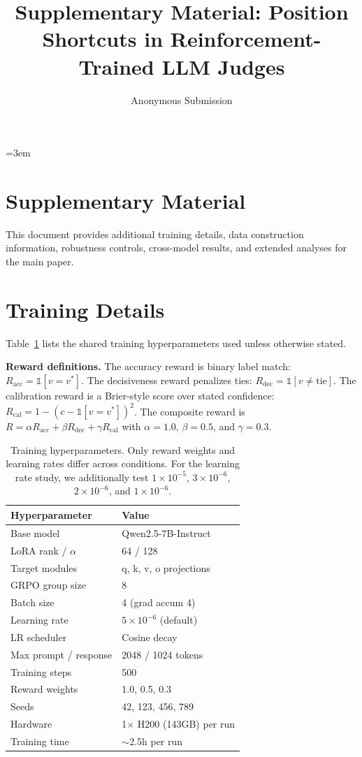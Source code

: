 \documentclass[letterpaper]{article}
\title{Supplementary Material: Position Shortcuts in Reinforcement-Trained LLM Judges}
\author{Anonymous Submission}
\begin{document}
\emergencystretch=3em
\maketitle

\section*{Supplementary Material}
This document provides additional training details, data construction information, robustness controls, cross-model results, and extended analyses for the main paper.

\appendix
\section{Training Details}
\label{app:training}

Table~\ref{tab:hparams} lists the shared training hyperparameters used unless otherwise stated.

\textbf{Reward definitions.} The accuracy reward is binary label match: $R_{\text{acc}} = \mathbb{1}[v = v^*]$. The decisiveness reward penalizes ties: $R_{\text{dec}} = \mathbb{1}[v \neq \text{tie}]$. The calibration reward is a Brier-style score over stated confidence: $R_{\text{cal}} = 1 - (c - \mathbb{1}[v = v^*])^2$. The composite reward is $R = \alpha R_{\text{acc}} + \beta R_{\text{dec}} + \gamma R_{\text{cal}}$ with $\alpha = 1.0$, $\beta = 0.5$, and $\gamma = 0.3$.

\begin{table}[htbp]
\centering
\footnotesize
\begin{tabular}{ll}
\toprule
\textbf{Hyperparameter} & \textbf{Value} \\
\midrule
Base model & Qwen2.5-7B-Instruct \\
LoRA rank / $\alpha$ & 64 / 128 \\
Target modules & q, k, v, o projections \\
GRPO group size & 8 \\
Batch size & 4 (grad accum 4) \\
Learning rate & $5 \times 10^{-6}$ (default) \\
LR scheduler & Cosine decay \\
Max prompt / response & 2048 / 1024 tokens \\
Training steps & 500 \\
Reward weights & 1.0, 0.5, 0.3 \\
Seeds & 42, 123, 456, 789 \\
Hardware & 1$\times$ H200 (143GB) per run \\
Training time & $\sim$2.5h per run \\
\bottomrule
\end{tabular}
\caption{Training hyperparameters. Only reward weights and learning rates differ across conditions. For the learning rate study, we additionally test $1 \times 10^{-5}$, $3 \times 10^{-6}$, $2 \times 10^{-6}$, and $1 \times 10^{-6}$.}
\label{tab:hparams}
\end{table}
\end{document}
